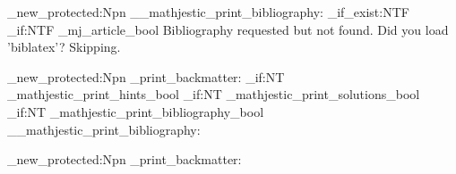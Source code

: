 \ExplSyntaxOn

\cs_new_protected:Npn \__mathjestic_print_bibliography:
  {
    \cs_if_exist:NTF \printbibliography
      {
        \clearpage
        \bool_if:NTF \g_mj_article_bool
          { \printbibliography[heading=subbibintoc, title={Daftar~Pustaka}] }
          { \printbibliography[heading=bibintoc, title={Daftar~Pustaka}] }
      }
      {
          {Bibliography requested but \string\printbibliography\space not found.%
           \MessageBreak Did you load 'biblatex'? Skipping.}
      }
  }

\cs_new_protected:Npn \mathjestic_print_backmatter:
  {
    \bool_if:NT \g_mathjestic_print_hints_bool      { \clearpage \printhints }
    \bool_if:NT \g_mathjestic_print_solutions_bool  { \clearpage \printsolutions }
    \bool_if:NT \g_mathjestic_print_bibliography_bool
      { \__mathjestic_print_bibliography: }
  }

\cs_new_protected:Npn \mathjesticPrintBackmatter
  { \mathjestic_print_backmatter: }

\ExplSyntaxOff
